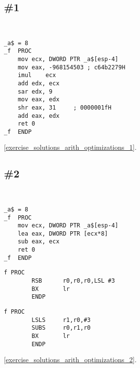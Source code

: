 \section{\Exercises}

\subsection{\Exercise \#1}
\label{exercise_arith_optimizations_1}

\WhatThisCodeDoes\

\begin{lstlisting}[caption=MSVC 2010 /Ox]
_a$ = 8
_f	PROC
	mov	ecx, DWORD PTR _a$[esp-4]
	mov	eax, -968154503	; c64b2279H
	imul	ecx
	add	edx, ecx
	sar	edx, 9
	mov	eax, edx
	shr	eax, 31		; 0000001fH
	add	eax, edx
	ret	0
_f	ENDP
\end{lstlisting}

\Answer\: \ref{exercise_solutions_arith_optimizations_1}.

\subsection{\Exercise \#2}
\label{exercise_arith_optimizations_2}

\WhatThisCodeDoes\

\begin{lstlisting}[caption=MSVC 2010 /Ox]
_a$ = 8
_f	PROC
	mov	ecx, DWORD PTR _a$[esp-4]
	lea	eax, DWORD PTR [ecx*8]
	sub	eax, ecx
	ret	0
_f	ENDP
\end{lstlisting}

\begin{lstlisting}[caption=Keil 5.03 (\ARMMode)]
f PROC
        RSB      r0,r0,r0,LSL #3
        BX       lr
        ENDP
\end{lstlisting}

\begin{lstlisting}[caption=Keil 5.03 (\ThumbMode)]
f PROC
        LSLS     r1,r0,#3
        SUBS     r0,r1,r0
        BX       lr
        ENDP
\end{lstlisting}

\Answer\: \ref{exercise_solutions_arith_optimizations_2}.
